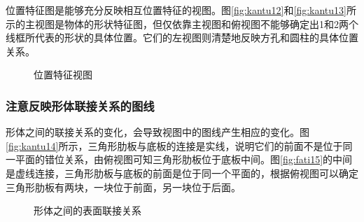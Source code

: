 位置特征图是能够充分反映相互位置特征的视图。图\ref{fig:kantu12}和\ref{fig:kantu13}所示的主视图是物体的形状特征图，但仅依靠主视图和俯视图不能够确定出1和2两个线框所代表的形状的具体位置。它们的左视图则清楚地反映方孔和圆柱的具体位置关系。
\begin{figure}[htbp]
\centering
{}\hspace{30pt}
\caption{位置特征视图}
\end{figure}
\subsubsection{注意反映形体联接关系的图线}
形体之间的联接关系的变化，会导致视图中的图线产生相应的变化。图\ref{fig:kantu14}所示，三角形肋板与底板的连接是实线，说明它们的前面不是位于同一平面的错位关系，由俯视图可知三角形肋板位于底板中间。图\ref{fig:fati15}的中间是虚线连接，三角形肋板与底板的前面是位于同一个平面的，根据俯视图可以确定三角形肋板有两块，一块位于前面，另一块位于后面。
\begin{figure}[htbp]
\centering
{}\hspace{30pt}
\caption{形体之间的表面联接关系}
\end{figure}
\endinput